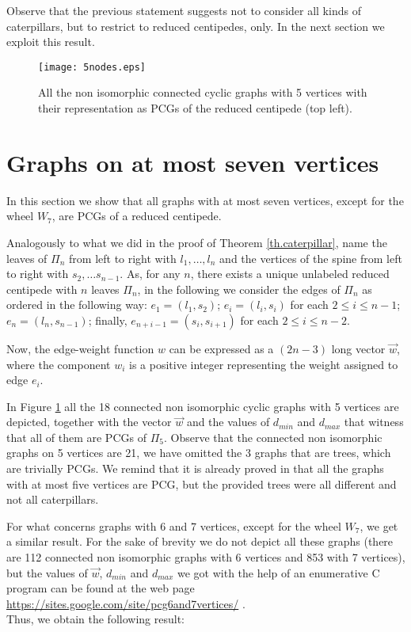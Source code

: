 \documentclass[review]{elsarticle}
\begin{document}
Observe that the previous statement suggests not to consider all kinds of caterpillars, but to restrict to reduced centipedes, only.
In the next section we exploit this result.

\begin{figure}[!ht]
\centering
\texttt{[image: 5nodes.eps]}
\caption{All the non isomorphic connected cyclic graphs with 5 vertices with their representation as PCGs of the reduced centipede (top left).} \label{fig.5nodes}
\end{figure}

\section{Graphs on at most seven vertices}


In this section we show that all graphs with at most seven vertices, except for the wheel $W_7$, are PCGs of a  reduced centipede. 

Analogously to what we did in the proof of Theorem \ref{th.caterpillar}, name the leaves of $\Pi_n$ from left to right with $l_1, \ldots , l_n$ and the vertices of the spine from left to right with $s_2, \ldots s_{n-1}$.
As, for any $n$, there exists a unique unlabeled reduced centipede with $n$ leaves $\Pi_n$, in the following we consider the edges of $\Pi_n$ as ordered in the following way:
$e_1= (l_1, s_2)$; $e_i=(l_i, s_i)$ for each $2 \leq i \leq n-1$; $e_n=(l_n, s_{n-1})$; finally, $e_{n+i-1}=(s_i, s_{i+1})$ for each $2 \leq i \leq n-2$.

Now, the edge-weight function $w$ can be expressed as a $(2n-3)$ long vector $\vec{w}$, where the component $w_i$ is a positive integer representing the weight assigned to edge $e_i$.

In Figure \ref{fig.5nodes} all the 18 connected non isomorphic cyclic graphs with 5 vertices are depicted, together with the vector $\vec{w}$ and the values of $d_{min}$ and $d_{max}$ that witness that all of them are PCGs of $\Pi_5$.  Observe that the connected non isomorphic graphs on 5 vertices are 21, we have omitted the 3 graphs that are trees, which are trivially PCGs.
We remind that it is already proved in \cite{P02} that all the graphs with at most five vertices are PCG, but the provided trees were all different and not all caterpillars.

\medskip

For what concerns graphs with 6 and 7 vertices, except for the wheel $W_7$, we get a similar result. 
For the sake of brevity we do not depict all these graphs (there are 112 connected non isomorphic graphs with 6 vertices and 853 with 7 vertices), but the values of $\vec{w}$, $d_{min}$ and $d_{max}$ we got with the help of an enumerative C program can be found at the web page \url{https://sites.google.com/site/pcg6and7vertices/} .\\
Thus, we obtain the following result:
\end{document}
